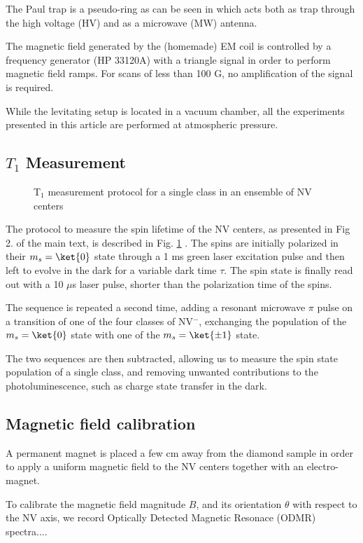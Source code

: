 \documentclass[preprintnumbers,amsmath,amssymb,onecolumn,12pt]{revtex4}
\begin{document}
The Paul trap is a pseudo-ring as can be seen in \citep{DelordPhD} which acts both as trap through the high voltage (HV) and as a microwave (MW) antenna.

The magnetic field generated by the (homemade) EM coil is controlled by a frequency generator (HP 33120A) with a triangle signal in order to perform magnetic field ramps. For scans of less than 100 G, no amplification of the signal is required.

While the levitating setup is located in a vacuum chamber, all the experiments presented in this article are performed at atmospheric pressure.


\subsection{$T_1$ Measurement}
\begin{figure}[!ht]
  \centering {}
  \caption{T$_1$ measurement protocol for a single class in an ensemble of NV centers}
	\label{T1_protocol}
\end{figure}
The protocol to measure the spin lifetime of the NV centers, as presented in Fig 2. of the main text, is described in Fig. \ref{T1_protocol} . The spins are initially polarized in their $m_s=\ket{0}$ state through a 1 ms green laser excitation pulse and then left to evolve in the dark for a variable dark time $\tau$. The spin state is finally read out with a 10 $\mu$s laser pulse, shorter than the polarization time of the spins.

The sequence is repeated a second time, adding a resonant microwave $\pi$ pulse on a transition of one of the four classes of NV$^-$, exchanging the population of the $m_s=\ket{0}$ state with one of the $m_s=\ket{\pm 1}$ state.

The two sequences are then subtracted, allowing us to measure the spin state population of a single class, and removing unwanted contributions to the photoluminescence, such as charge state transfer in the dark.

\subsection{Magnetic field calibration}

A permanent magnet is placed a few cm away from the diamond sample in order to apply a uniform magnetic field to the NV centers together with an electro-magnet.

To calibrate the magnetic field magnitude $B$, and its orientation $\theta$ with respect to the NV axis, we record Optically Detected Magnetic Resonace (ODMR) spectra.... 
\end{document}
